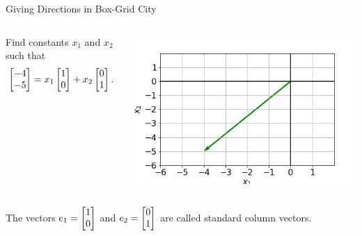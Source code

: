 \documentclass[xcolor=dvipsnames,aspectratio=169,t]{beamer}
\begin{document}
\begin{frame}{Giving Directions in Box-Grid City}

  \begin{columns}[T]
    \column{0.5\tw}
  
  \begin{example}

    Find constants $x_1$ and $x_2$ such that
    \[ \begin{bmatrix} -4 \\ -5 \end{bmatrix} = x_1 \begin{bmatrix} 1 \\ 0 \end{bmatrix} + x_2 \begin{bmatrix} 0 \\ 1 \end{bmatrix} .\]
\end{example}

  \column{0.5\tw}

  \includegraphics[width=0.95\tw]{images/fig-span1.png}

  \end{columns}

  \vfill
  
  \pause
  \bbox
  The vectors $e_1 = \begin{bmatrix} 1 \\ 0 \end{bmatrix}$ and $e_2 = \begin{bmatrix} 0 \\ 1 \end{bmatrix}$ are called \alert{standard column vectors}.
  \ebox

  \end{frame}
\end{document}
